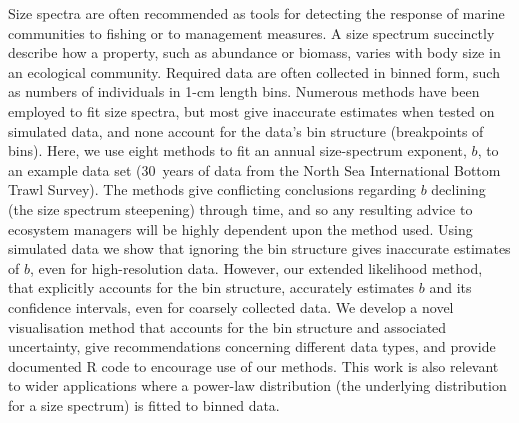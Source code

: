 \documentclass[12pt, letter]{article}
\begin{document}
Size spectra are often recommended as tools for detecting the
response of marine communities to fishing or to management measures.
A size spectrum succinctly describe how a
property, such as abundance or biomass, varies with body size in an ecological
community.
Required
data are often collected in binned form, such as numbers of individuals
in 1-cm length bins.
Numerous methods have been employed to fit size spectra, but most give
inaccurate estimates when tested on simulated data, and none account for the
data's bin structure (breakpoints of bins).
Here, we use eight methods to fit an annual size-spectrum
exponent, $b$, to an example data set (30~years of data from the North Sea
International Bottom Trawl Survey).
The methods give conflicting conclusions regarding $b$ declining
(the size spectrum steepening) through time, and so any resulting advice
to ecosystem managers will be highly dependent upon the method used.
Using simulated data we show that ignoring the bin structure gives inaccurate
estimates of $b$,
even for high-resolution data. However, our extended likelihood method, that
explicitly accounts for the bin structure, accurately estimates $b$ and its
confidence intervals, even for coarsely collected data.
We develop a novel visualisation method that accounts for the bin
structure and associated uncertainty, give
recommendations concerning different data types, and
provide documented R code to encourage use of our methods.
This work is also relevant to wider applications where
a power-law distribution (the underlying distribution for a size spectrum) is
fitted to binned data.







\end{document}
